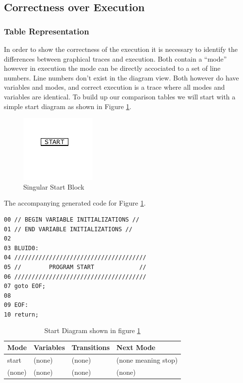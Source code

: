 \subsection{Correctness over Execution}
\subsubsection{Table Representation}

In order to show the correctness of the execution it is necessary to identify the differences between graphical traces and execution. Both contain a ``mode'' however in execution the mode can be directly accociated to a set of line numbers. Line numbers don't exist in the diagram view. Both however do have variables and modes, and correct execution is a trace where all modes and variables are identical. To build up our comparison tables we will start with a simple start diagram as shown in Figure \ref{fig:correctness_ex_start}.

\clearpage
\begin{figure}[h]
	\centering
	\includegraphics[width=\imgsmall]{./images/correctness_ex_start.png}
	\caption{Singular Start Block}
	\label{fig:correctness_ex_start}
\end{figure}


The accompanying generated  code for Figure \ref{fig:correctness_ex_start}.

\begin{lstlisting}[frame=single]
00 // BEGIN VARIABLE INITIALIZATIONS //
01 // END VARIABLE INITIALIZATIONS //
02
03 BLUID0:
04 //////////////////////////////////////
05 //        PROGRAM START             //
06 //////////////////////////////////////
07 goto EOF;
08 
09 EOF:
10 return;
\end{lstlisting}

\begin{table}[htcb]
	\caption{Start Diagram shown in figure \ref{fig:correctness_ex_start}}
	\centering
		\begin{tabular}{| l | l | l | l |}
			\hline
			\textbf{Mode} & \textbf{Variables} & \textbf{Transitions} & \textbf{Next Mode} \\
			\hline
			start & (none) & (none) & (none meaning stop) \\
			\hline
			(none) & (none) & (none) & (none) \\
			\hline
		\end{tabular}
	\label{table:BasicDiagOnly}
\end{table}


